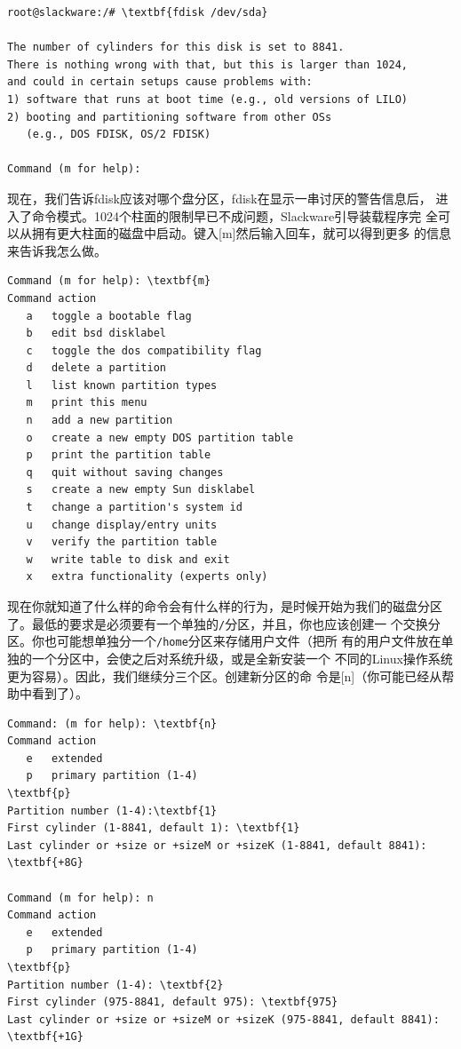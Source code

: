 \begin{Verbatim}[frame=single,commandchars=\\\{\}]
 root@slackware:/# \textbf{fdisk /dev/sda}

The number of cylinders for this disk is set to 8841.
There is nothing wrong with that, but this is larger than 1024,
and could in certain setups cause problems with:
1) software that runs at boot time (e.g., old versions of LILO)
2) booting and partitioning software from other OSs
   (e.g., DOS FDISK, OS/2 FDISK)

Command (m for help): 
\end{Verbatim}
现在，我们告诉fdisk应该对哪个盘分区，fdisk在显示一串讨厌的警告信息后，
进入了命令模式。1024个柱面的限制早已不成问题，Slackware引导装载程序完
全可以从拥有更大柱面的磁盘中启动。键入[m]然后输入回车，就可以得到更多
的信息来告诉我怎么做。
\begin{Verbatim}[frame=single,commandchars=\\\{\}]
Command (m for help): \textbf{m}
Command action
   a   toggle a bootable flag
   b   edit bsd disklabel
   c   toggle the dos compatibility flag
   d   delete a partition
   l   list known partition types
   m   print this menu
   n   add a new partition
   o   create a new empty DOS partition table
   p   print the partition table
   q   quit without saving changes
   s   create a new empty Sun disklabel
   t   change a partition's system id
   u   change display/entry units
   v   verify the partition table
   w   write table to disk and exit
   x   extra functionality (experts only)
\end{Verbatim}
现在你就知道了什么样的命令会有什么样的行为，是时候开始为我们的磁盘分区
了。最低的要求是必须要有一个单独的\texttt{/}分区，并且，你也应该创建一
个交换分区。你也可能想单独分一个\texttt{/home}分区来存储用户文件（把所
有的用户文件放在单独的一个分区中，会使之后对系统升级，或是全新安装一个
不同的Linux操作系统更为容易）。因此，我们继续分三个区。创建新分区的命
令是[n]（你可能已经从帮助中看到了）。
\begin{Verbatim}[frame=single,commandchars=\\\{\}]
Command: (m for help): \textbf{n}
Command action
   e   extended
   p   primary partition (1-4)
\textbf{p}
Partition number (1-4):\textbf{1} 
First cylinder (1-8841, default 1): \textbf{1}
Last cylinder or +size or +sizeM or +sizeK (1-8841, default 8841): \textbf{+8G}

Command (m for help): n
Command action
   e   extended
   p   primary partition (1-4)
\textbf{p}
Partition number (1-4): \textbf{2}
First cylinder (975-8841, default 975): \textbf{975}
Last cylinder or +size or +sizeM or +sizeK (975-8841, default 8841): \textbf{+1G}
\end{Verbatim}
